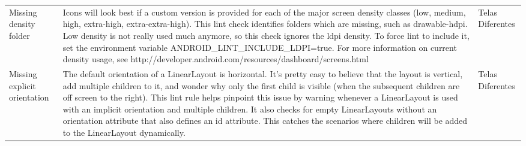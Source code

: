\begin{landscape}
\begin{longtable}{p{30mm}|p{180mm}|p{25mm}}
Missing density folder
&Icons will look best if a custom version is provided for each of the major screen density classes (low, medium, high, extra-high, extra-extra-high). This lint check identifies folders which are missing, such as drawable-hdpi. Low density is not really used much anymore, so this check ignores the ldpi density. To force lint to include it, set the environment variable ANDROID\_LINT\_INCLUDE\_LDPI=true. For more information on current density usage, see http://developer.android.com/resources/dashboard/screens.html
&Telas Diferentes\\

Missing explicit orientation
&The default orientation of a LinearLayout is horizontal. It's pretty easy to believe that the layout is vertical, add multiple children to it, and wonder why only the first child is visible (when the subsequent children are off screen to the right). This lint rule helps pinpoint this issue by warning whenever a LinearLayout is used with an implicit orientation and multiple children.  It also checks for empty LinearLayouts without an orientation attribute that also defines an id attribute. This catches the scenarios where children will be added to the LinearLayout dynamically.
&Telas Diferentes
 
\end{longtable}

\end{landscape}
